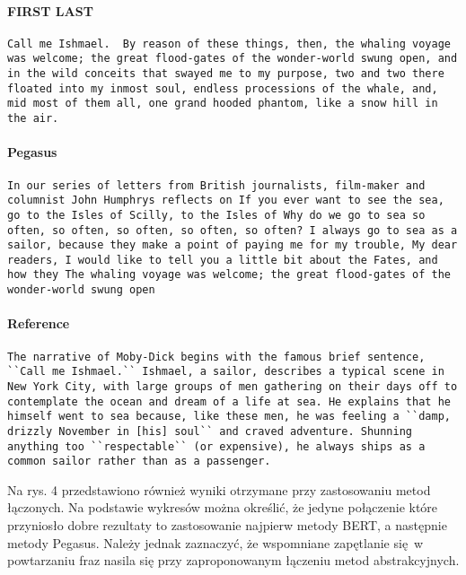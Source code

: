 \documentclass{article}
\begin{document}
\paragraph{FIRST LAST}
\begin{center}
\begin{lstlisting}
Call me Ishmael.  By reason of these things, then, the whaling voyage was welcome; the great flood-gates of the wonder-world swung open, and in the wild conceits that swayed me to my purpose, two and two there floated into my inmost soul, endless processions of the whale, and, mid most of them all, one grand hooded phantom, like a snow hill in the air.
\end{lstlisting}
\end{center}
\paragraph{Pegasus}
\begin{center}
\begin{lstlisting}
In our series of letters from British journalists, film-maker and columnist John Humphrys reflects on If you ever want to see the sea, go to the Isles of Scilly, to the Isles of Why do we go to sea so often, so often, so often, so often, so often? I always go to sea as a sailor, because they make a point of paying me for my trouble, My dear readers, I would like to tell you a little bit about the Fates, and how they The whaling voyage was welcome; the great flood-gates of the wonder-world swung open
\end{lstlisting}
\end{center}
\paragraph{Reference}
\begin{center}
\begin{lstlisting}
The narrative of Moby-Dick begins with the famous brief sentence, ``Call me Ishmael.`` Ishmael, a sailor, describes a typical scene in New York City, with large groups of men gathering on their days off to contemplate the ocean and dream of a life at sea. He explains that he himself went to sea because, like these men, he was feeling a ``damp, drizzly November in [his] soul`` and craved adventure. Shunning anything too ``respectable`` (or expensive), he always ships as a common sailor rather than as a passenger.
\end{lstlisting}
\end{center}

Na rys. 4 przedstawiono również wyniki otrzymane 
przy zastosowaniu metod łączonych. Na podstawie wykresów
można określić, że jedyne połączenie które przyniosło
dobre rezultaty to zastosowanie najpierw metody BERT,
a następnie metody Pegasus. Należy jednak zaznaczyć, że
wspomniane zapętlanie się w powtarzaniu fraz nasila się 
przy zaproponowanym łączeniu metod abstrakcyjnych.



\end{document}
